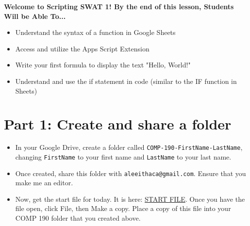 \documentclass{article}
\newcommand{\AName}{Scripting SWAT 1}
\begin{document}
\textbf{Welcome to \AName!  By the end of this lesson, Students Will be Able To...}
\begin{itemize}
    \item Understand the syntax of a function in Google Sheets
    \item Access and utilize the Apps Script Extension
    \item Write your first formula to display the text "Hello, World!"
    \item Understand and use the if statement in code (similar to the IF function in Sheets)
\end{itemize}


\section*{Part 1: Create and share a folder}
\begin{itemize}
    \item In your Google Drive, create a folder called \texttt{COMP-190-FirstName-LastName}, changing \texttt{FirstName} to your first name and \texttt{LastName} to your last name.
    \item Once created, share this folder with \texttt{aleeithaca@gmail.com}. Ensure that you make me an editor.
    \item Now, get the start file for today.  It is here:  \href{https://docs.google.com/spreadsheets/d/1c8rY__uY16zxf3txmKeaJEFhvZC_TXYjo3vKsJoKHhE/edit?usp=sharing}{START FILE}.  Once you have the file open, click File, then Make a copy.  Place a copy of this file into your COMP 190 folder that you created above.
\end{itemize}
\end{document}
